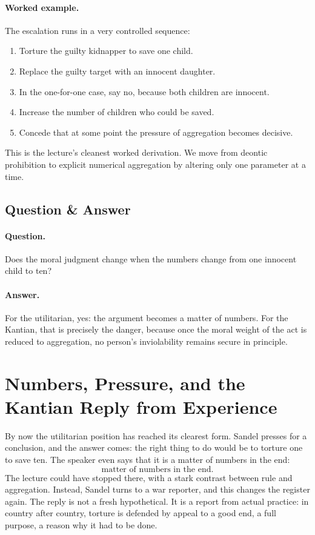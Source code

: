 \paragraph{Worked example.} The escalation runs in a very controlled sequence:
\begin{enumerate}
\item Torture the guilty kidnapper to save one child.
\item Replace the guilty target with an innocent daughter.
\item In the one-for-one case, say no, because both children are innocent.
\item Increase the number of children who could be saved.
\item Concede that at some point the pressure of aggregation becomes decisive.
\end{enumerate}
This is the lecture's cleanest worked derivation. We move from deontic prohibition to explicit numerical aggregation by altering only one parameter at a time.

\subsection{Question \& Answer}

\paragraph{Question.} Does the moral judgment change when the numbers change from one innocent child to ten?

\paragraph{Answer.} For the utilitarian, yes: the argument becomes a matter of numbers. For the Kantian, that is precisely the danger, because once the moral weight of the act is reduced to aggregation, no person's inviolability remains secure in principle.

\section{Numbers, Pressure, and the Kantian Reply from Experience}

By now the utilitarian position has reached its clearest form. Sandel presses for a conclusion, and the answer comes: the right thing to do would be to torture one to save ten. The speaker even says that it is a matter of numbers in the end:
\begin{equation}
\text{matter of numbers in the end}.
\end{equation}
The lecture could have stopped there, with a stark contrast between rule and aggregation. Instead, Sandel turns to a war reporter, and this changes the register again. The reply is not a fresh hypothetical. It is a report from actual practice: in country after country, torture is defended by appeal to a good end, a full purpose, a reason why it had to be done.


